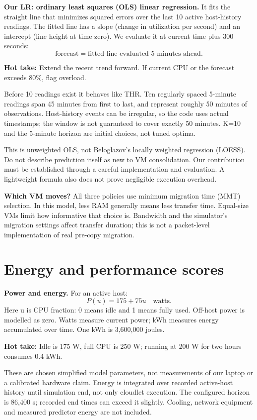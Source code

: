 \documentclass[11pt,a4paper]{article}
\newcommand{\hot}[1]{\par\textbf{Hot take:} #1\par}
\begin{document}
\textbf{Our LR: ordinary least squares (OLS) linear regression.} It fits the straight line that minimizes squared errors over the last 10 active host-history readings. The fitted line has a slope (change in utilization per second) and an intercept (line height at time zero). We evaluate it at current time plus 300 seconds:
\[\text{forecast}=\text{fitted line evaluated 5 minutes ahead}.\]
\hot{Extend the recent trend forward. If current CPU or the forecast exceeds 80\%, flag overload.}
Before 10 readings exist it behaves like THR. Ten regularly spaced 5-minute readings span 45 minutes from first to last, and represent roughly 50 minutes of observations. Host-history events can be irregular, so the code uses actual timestamps; the window is not guaranteed to cover exactly 50 minutes. K=10 and the 5-minute horizon are initial choices, not tuned optima.

This is unweighted OLS, not Beloglazov's locally weighted regression (LOESS). Do not describe prediction itself as new to VM consolidation. Our contribution must be established through a careful implementation and evaluation. A lightweight formula also does not prove negligible execution overhead.

\textbf{Which VM moves?} All three policies use minimum migration time (MMT) selection. In this model, less RAM generally means less transfer time. Equal-size VMs limit how informative that choice is. Bandwidth and the simulator's migration settings affect transfer duration; this is not a packet-level implementation of real pre-copy migration.

\newpage
\section{Energy and performance scores}
\textbf{Power and energy.} For an active host:
\[P(u)=175+75u\quad\text{watts}.\]
Here u is CPU fraction: 0 means idle and 1 means fully used. Off-host power is modelled as zero. Watts measure current power; kWh measures energy accumulated over time. One kWh is 3,600,000 joules.
\hot{Idle is 175 W, full CPU is 250 W; running at 200 W for two hours consumes 0.4 kWh.}
These are chosen simplified model parameters, not measurements of our laptop or a calibrated hardware claim. Energy is integrated over recorded active-host history until simulation end, not only cloudlet execution. The configured horizon is 86,400 s; recorded end times can exceed it slightly. Cooling, network equipment and measured predictor energy are not included.
\end{document}
